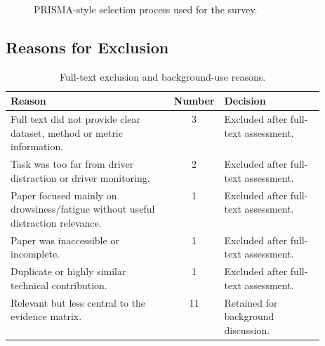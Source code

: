 \documentclass[11pt,a4paper]{article}
\let\oldsubsection\subsection
\renewcommand{\subsection}{\Needspace{6\baselineskip}\oldsubsection}
\begin{document}
\begin{figure}[H]
{
}
\caption{PRISMA-style selection process used for the survey.}
\label{fig:prisma_corrected}
\end{figure}

\subsection{Reasons for Exclusion}

\begin{table}[H]
\centering
\caption{Full-text exclusion and background-use reasons.}
\label{tab:exclusion_reasons}
\small
\renewcommand{\arraystretch}{1.10}
\begin{tabularx}{0.92\linewidth}{>{\RaggedRight\arraybackslash}p{0.52\linewidth} c >{\RaggedRight\arraybackslash}X}
\toprule
\textbf{Reason} & \textbf{Number} & \textbf{Decision} \\
\midrule
Full text did not provide clear dataset, method or metric information. & 3 & Excluded after full-text assessment. \\
Task was too far from driver distraction or driver monitoring. & 2 & Excluded after full-text assessment. \\
Paper focused mainly on drowsiness/fatigue without useful distraction relevance. & 1 & Excluded after full-text assessment. \\
Paper was inaccessible or incomplete. & 1 & Excluded after full-text assessment. \\
Duplicate or highly similar technical contribution. & 1 & Excluded after full-text assessment. \\
Relevant but less central to the evidence matrix. & 11 & Retained for background discussion. \\
\bottomrule
\end{tabularx}
\normalsize
\end{table}
\end{document}
